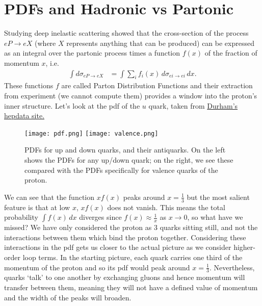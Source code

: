 \documentclass[relqm.tex]{subfiles}
\begin{document}
\chapter{PDFs and Hadronic vs Partonic}
Studying deep inelastic scattering showed that the cross-section of the process $eP\to eX$ (where $X$ represents anything that can be produced) can be expressed as an integral over the partonic process times a function $f(x)$ of the fraction of momentum $x$, i.e.
\begin{align}
    \int d\sigma_{eP\to eX} &= \int \sum_i f_i(x)\,d\sigma_{ei\to ei}\,dx.
\end{align}
These functions $f$ are called Parton Distribution Functions and their extraction from experiment (we cannot compute them) provides a window into the proton's inner structure. 
Let's look at the pdf of the $u$ quark, taken from \href{http://hepdata.cedar.ac.uk/pdf/pdf3.html}{Durham's hepdata site.}
\begin{figure}[H]
    \centering
    \texttt{[image: pdf.png]}
    \texttt{[image: valence.png]}
    \caption{PDFs for up and down quarks, and their antiquarks. On the left shows the PDFs for any up/down quark; on the right, we see these compared with the PDFs specifically for valence quarks of the proton.}
    \vspace{-20pt}
\end{figure}
We can see that the function $xf(x)$ peaks around $x=\frac13$ but the most salient feature is that at low $x$, $xf(x)$ does not vanish. 
This means the total probability $\int f(x)\,dx$ diverges since $f(x)\approx\frac1x$ as $x\to0$, so what have we missed?
We have only considered the proton as 3 quarks sitting still, and not the interactions between them which bind the proton together. 
Considering these interactions in the pdf gets us closer to the actual picture as we consider higher-order loop terms. 
In the starting picture, each quark carries one third of the momentum of the proton and so its pdf would peak around $x=\frac13$.
Nevertheless, quarks `talk' to one another by exchanging gluons and hence momentum will transfer between them, meaning they will not have a defined value of momentum and the width of the peaks will broaden.
\end{document}
